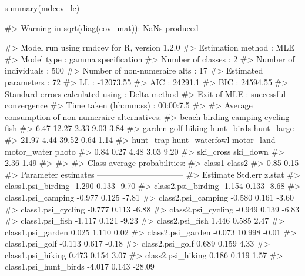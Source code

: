 \begin{Schunk}
\begin{Sinput}
summary(mdcev_lc)
\end{Sinput}
\begin{Soutput}
#> Warning in sqrt(diag(cov_mat)): NaNs produced
\end{Soutput}
\begin{Soutput}
#> Model run using rmdcev for R, version 1.2.0 
#> Estimation method                : MLE
#> Model type                       : gamma specification
#> Number of classes                : 2
#> Number of individuals            : 500
#> Number of non-numeraire alts     : 17
#> Estimated parameters             : 72
#> LL                               : -12073.55
#> AIC                              : 24291.1
#> BIC                              : 24594.55
#> Standard errors calculated using : Delta method
#> Exit of MLE                      : successful convergence
#> Time taken (hh:mm:ss)            : 00:00:7.5
#> 
#> Average consumption of non-numeraire alternatives:
#>          beach        birding        camping        cycling           fish 
#>           6.47          12.27           2.33           9.03           3.84 
#>         garden           golf         hiking     hunt_birds     hunt_large 
#>          21.97           4.44          39.52           0.64           1.14 
#>      hunt_trap hunt_waterfowl     motor_land    motor_water          photo 
#>           0.84           0.27           4.48           3.03           9.20 
#>      ski_cross       ski_down 
#>           2.36           1.49 
#> 
#> 
#> Class average probabilities:
#> class1 class2 
#>   0.85   0.15 
#> Parameter estimates --------------------------------  
#>                             Estimate Std.err z.stat
#> class1.psi_birding            -1.290   0.133  -9.70
#> class2.psi_birding            -1.154   0.133  -8.68
#> class1.psi_camping            -0.977   0.125  -7.81
#> class2.psi_camping            -0.580   0.161  -3.60
#> class1.psi_cycling            -0.777   0.113  -6.88
#> class2.psi_cycling            -0.949   0.139  -6.83
#> class1.psi_fish               -1.117   0.121  -9.23
#> class2.psi_fish                1.446   0.585   2.47
#> class1.psi_garden              0.025   1.110   0.02
#> class2.psi_garden             -0.073  10.998  -0.01
#> class1.psi_golf               -0.113   0.617  -0.18
#> class2.psi_golf                0.689   0.159   4.33
#> class1.psi_hiking              0.473   0.154   3.07
#> class2.psi_hiking              0.186   0.119   1.57
#> class1.psi_hunt_birds         -4.017   0.143 -28.09

\end{Soutput}
\end{Schunk}
